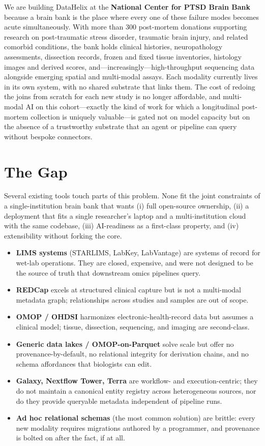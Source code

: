 \documentclass[sigconf, nonacm]{acmart}
\begin{document}
We are building DataHelix at the \textbf{National Center for PTSD Brain Bank} because a brain bank is the place where every one of these failure modes becomes acute simultaneously. With more than 300 post-mortem donations supporting research on post-traumatic stress disorder, traumatic brain injury, and related comorbid conditions, the bank holds clinical histories, neuropathology assessments, dissection records, frozen and fixed tissue inventories, histology images and derived scores, and---increasingly---high-throughput sequencing data alongside emerging spatial and multi-modal assays. Each modality currently lives in its own system, with no shared substrate that links them. The cost of redoing the joins from scratch for each new study is no longer affordable, and multi-modal AI on this cohort---exactly the kind of work for which a longitudinal post-mortem collection is uniquely valuable---is gated not on model capacity but on the absence of a trustworthy substrate that an agent or pipeline can query without bespoke connectors.

\section{The Gap}

Several existing tools touch parts of this problem. None fit the joint constraints of a single-institution brain bank that wants (i) full open-source ownership, (ii) a deployment that fits a single researcher's laptop and a multi-institution cloud with the same codebase, (iii) AI-readiness as a first-class property, and (iv) extensibility without forking the core.

\begin{itemize}
\item \textbf{LIMS systems} (STARLIMS, LabKey, LabVantage) are systems of record for wet-lab operations. They are closed, expensive, and were not designed to be the source of truth that downstream omics pipelines query.
\item \textbf{REDCap} excels at structured clinical capture but is not a multi-modal metadata graph; relationships across studies and samples are out of scope.
\item \textbf{OMOP / OHDSI} harmonizes electronic-health-record data but assumes a clinical model; tissue, dissection, sequencing, and imaging are second-class.
\item \textbf{Generic data lakes / OMOP-on-Parquet} solve scale but offer no provenance-by-default, no relational integrity for derivation chains, and no schema affordances that biologists can edit.
\item \textbf{Galaxy, Nextflow Tower, Terra} are workflow- and execution-centric; they do not maintain a canonical entity registry across heterogeneous sources, nor do they provide queryable metadata independent of pipeline runs.
\item \textbf{Ad hoc relational schemas} (the most common solution) are brittle: every new modality requires migrations authored by a programmer, and provenance is bolted on after the fact, if at all.
\end{itemize}
\end{document}
